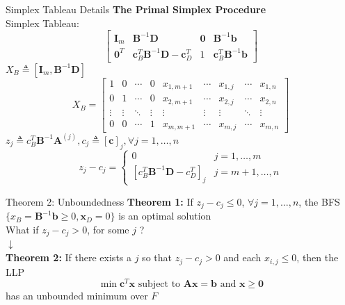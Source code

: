 \documentclass[aspectratio=169,hyperref,UTF8,CJK]{beamer}
\begin{document}
\begin{frame}{Simplex Tableau Details}
\textbf{The Primal Simplex Procedure} \\
Simplex Tableau:
\[
\begin{bmatrix}
\mathbf{I}_m & \mathbf{B}^{-1}\mathbf{D} & \mathbf{0} & \mathbf{B}^{-1}\mathbf{b} \\
\mathbf{0}^T & \mathbf{c}_B^T\mathbf{B}^{-1}\mathbf{D} - \mathbf{c}_D^T & 1 & \mathbf{c}_B^T\mathbf{B}^{-1}\mathbf{b}
\end{bmatrix}
\]
\(X_B \triangleq [\mathbf{I}_m, \mathbf{B}^{-1}\mathbf{D}]\)
\[
X_B = \begin{bmatrix} 1 & 0 & \cdots & 0 & x_{1,m+1} & \cdots & x_{1,j} & \cdots & x_{1,n} \\ 0 & 1 & \cdots & 0 & x_{2,m+1} & \cdots & x_{2,j} & \cdots & x_{2,n} \\ \vdots & \vdots & \ddots & \vdots & \vdots & \vdots & \vdots & \ddots & \vdots \\ 0 & 0 & \cdots & 1 & x_{m,m+1} & \cdots & x_{m,j} & \cdots & x_{m,n} \end{bmatrix}
\]
\(z_j \triangleq c_B^T \mathbf{B}^{-1} \mathbf{A}^{(j)}, c_j \triangleq [\mathbf{c}]_j, \forall j = 1, \ldots, n\)
\[
z_j - c_j = \begin{cases} 0 & j = 1, \ldots, m \\ [c_B^T \mathbf{B}^{-1} \mathbf{D} - c_D^T]_j & j = m+1, \ldots, n \end{cases}
\]
\end{frame}

\begin{frame}{Theorem 2: Unboundedness}
\textbf{Theorem 1:} If \(z_j - c_j \leq 0\), \(\forall j = 1, \ldots , n\), the BFS \(\{x_B = \mathbf{B}^{-1} \mathbf{b} \geq 0, \mathbf{x}_D = 0\}\) is an optimal solution \\
What if \(z_j - c_j > 0\), for some \(j\) ? \\
\(\downarrow\) \\
\textbf{Theorem 2:} If there exists a \(j\) so that \(z_j - c_j > 0\) and each \(x_{i,j} \leq 0\), then the LLP
\[
\min \mathbf{c}^T \mathbf{x} \text{ subject to } \mathbf{A} \mathbf{x} = \mathbf{b} \text{ and } \mathbf{x} \geq \mathbf{0}
\]
has an unbounded minimum over \(F\)
\end{frame}
\end{document}
